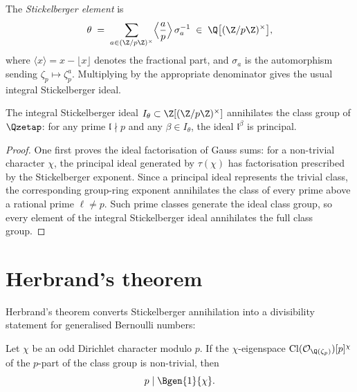 \begin{definition}\label{def:stickelberger}
  \leanok
The \emph{Stickelberger element} is
\[
  \theta \;=\; \sum_{a \in (\Z/p\Z)^\times}
                \Bigl\langle \frac{a}{p} \Bigr\rangle\,\sigma_a^{-1}
              \;\in\; \Q\bigl[(\Z/p\Z)^\times\bigr],
\]
where \(\langle x \rangle = x-\lfloor x\rfloor\) denotes the fractional
part, and \(\sigma_a\) is the automorphism sending
\(\zeta_p\mapsto\zeta_p^a\).  Multiplying by the appropriate denominator gives
the usual integral Stickelberger ideal.
\end{definition}

\begin{theorem}\label{thm:stickelberger}
  \leanok
The integral Stickelberger ideal $I_\theta \subset \Z[(\Z/p\Z)^\times]$
annihilates the class group of $\Qzetap$: for any prime $\mathfrak l \nmid p$
and any $\beta \in I_\theta$, the ideal $\mathfrak l^\beta$ is principal.
\end{theorem}

\begin{proof}\leanok
One first proves the ideal factorisation of Gauss sums:
for a non-trivial character \(\chi\), the principal ideal generated by
\(\tau(\chi)\) has factorisation prescribed by the Stickelberger exponent.
Since a principal ideal represents the trivial class, the corresponding
group-ring exponent annihilates the class of every prime above a rational
prime \(\ell\ne p\).  Such prime classes generate the ideal class group, so
every element of the integral Stickelberger ideal annihilates the full class
group.
\end{proof}

\section{Herbrand's theorem}

Herbrand's theorem converts Stickelberger annihilation into a divisibility
statement for generalised Bernoulli numbers:

\begin{theorem}\label{thm:herbrand}
  \leanok
Let $\chi$ be an odd Dirichlet character modulo $p$. If the
$\chi$-eigenspace $\mathrm{Cl}(\mathcal O_{\Q(\zeta_p)})[p]^\chi$ of the
$p$-part of the class group is non-trivial, then
\[
  p \mid \Bgen{1}{\chi}.
\]
\end{theorem}

